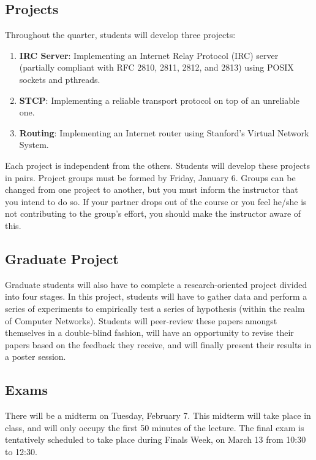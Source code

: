 \documentclass[11pt]{article}
\begin{document}
\subsection{Projects}

Throughout the quarter, students will develop three projects:

\begin{enumerate}
 \item \textbf{IRC Server}: Implementing an Internet Relay Protocol (IRC) server (partially compliant with RFC 2810, 2811, 2812, and 2813) using POSIX sockets and pthreads.
 \item \textbf{STCP}: Implementing a reliable transport protocol on top of an unreliable one.
 \item \textbf{Routing}: Implementing an Internet router using Stanford's Virtual Network System.
\end{enumerate}

Each project is independent from the others. Students will develop these projects in pairs. Project groups must be formed by Friday, January 6. Groups can be changed from one project to another, but you must inform the instructor that you intend to do so. If your partner drops out of the course or you feel he/she is not contributing to the group's effort, you should make the instructor aware of this.

\subsection{Graduate Project}

Graduate students will also have to complete a research-oriented project divided into four stages. In this project, students will have to gather data and perform a series of experiments to empirically test a series of hypothesis (within the realm of Computer Networks). Students will peer-review these papers amongst themselves in a double-blind fashion, will have an opportunity to revise their papers based on the feedback they receive, and will finally present their results in a poster session.

\subsection{Exams}

There will be a midterm on Tuesday, February 7. This midterm will take place in class, and will only occupy the first 50 minutes of the lecture. The final exam is tentatively scheduled to take place during Finals Week, on March 13 from 10:30 to 12:30.
\end{document}
